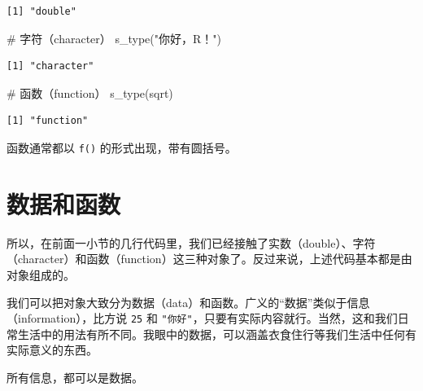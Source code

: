 \documentclass[
  letterpaper,
]{ctexbook}
\newenvironment{Shaded}{\begin{snugshade}}{\end{snugshade}}
\newcommand{\CommentTok}[1]{\textcolor[rgb]{0.37,0.37,0.37}{#1}}
\newcommand{\FunctionTok}[1]{\textcolor[rgb]{0.28,0.35,0.67}{#1}}
\newcommand{\NormalTok}[1]{\textcolor[rgb]{0.00,0.23,0.31}{#1}}
\newcommand{\StringTok}[1]{\textcolor[rgb]{0.13,0.47,0.30}{#1}}
\begin{document}
\begin{verbatim}
[1] "double"
\end{verbatim}

\begin{Shaded}
\begin{Highlighting}[]
\CommentTok{\# 字符（character）}
\FunctionTok{s\_type}\NormalTok{(}\StringTok{"你好，R！"}\NormalTok{)}
\end{Highlighting}
\end{Shaded}

\begin{verbatim}
[1] "character"
\end{verbatim}

\begin{Shaded}
\begin{Highlighting}[]
\CommentTok{\# 函数（function）}
\FunctionTok{s\_type}\NormalTok{(sqrt)}
\end{Highlighting}
\end{Shaded}

\begin{verbatim}
[1] "function"
\end{verbatim}

函数通常都以 \texttt{f()} 的形式出现，带有圆括号。

\hypertarget{ux6570ux636eux548cux51fdux6570}{%
\section{数据和函数}\label{ux6570ux636eux548cux51fdux6570}}

所以，在前面一小节的几行代码里，我们已经接触了实数（double）、字符（character）和函数（function）这三种对象了。反过来说，上述代码基本都是由对象组成的。

我们可以把对象大致分为数据（data）和函数。广义的``数据''类似于信息（information），比方说
\texttt{25} 和
\texttt{"你好"}，只要有实际内容就行。当然，这和我们日常生活中的用法有所不同。我眼中的数据，可以涵盖衣食住行等我们生活中任何有实际意义的东西。

\begin{tcolorbox}[enhanced jigsaw, bottomtitle=1mm, bottomrule=.15mm, coltitle=black, title=\textcolor{quarto-callout-note-color}{\faInfo}\hspace{0.5em}{笔记}, toptitle=1mm, colframe=quarto-callout-note-color-frame, colbacktitle=quarto-callout-note-color!10!white, opacitybacktitle=0.6, arc=.35mm, opacityback=0, breakable, toprule=.15mm, left=2mm, titlerule=0mm, rightrule=.15mm, colback=white, leftrule=.75mm]

所有信息，都可以是数据。

\end{tcolorbox}
\end{document}
